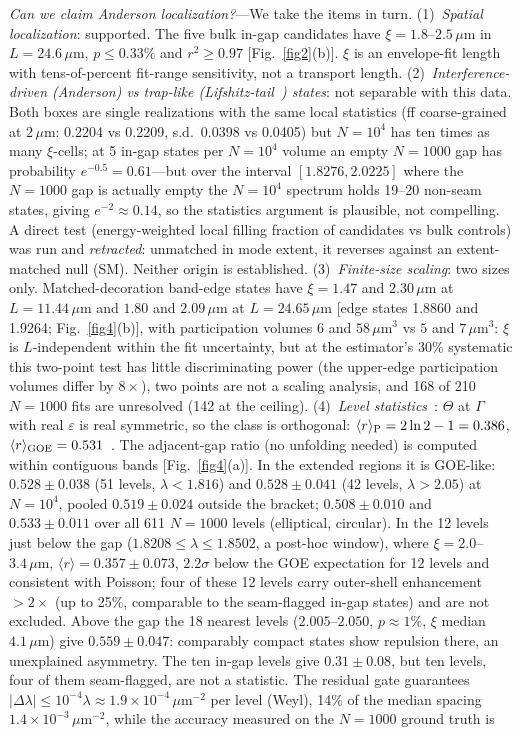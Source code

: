\documentclass[prl,twocolumn,superscriptaddress,showpacs]{revtex4-2}
\newcommand{\um}{\,\mu\mathrm{m}}
\newcommand{\umi}{\,\mu\mathrm{m}^{-2}}
\begin{document}
\emph{Can we claim Anderson localization?}---We take the items in turn. (1)~\emph{Spatial localization}: supported. The five bulk in-gap candidates have $\xi=1.8$--$2.5\um$ in $L=24.6\um$, $p\le0.33\%$ and $r^2\ge0.97$ [Fig.~\ref{fig2}(b)]. $\xi$ is an envelope-fit length with tens-of-percent fit-range sensitivity, not a transport length. (2)~\emph{Interference-driven (Anderson) vs trap-like (Lifshitz-tail~\cite{Lifshitz1964}) states}: not separable with this data. Both boxes are single realizations with the same local statistics (ff coarse-grained at $2\um$: 0.2204 vs 0.2209, s.d.\ 0.0398 vs 0.0405) but $N=10^4$ has ten times as many $\xi$-cells; at 5 in-gap states per $N=10^4$ volume an empty $N=1000$ gap has probability $e^{-0.5}=0.61$---but over the interval $[1.8276,2.0225]$ where the $N=1000$ gap is actually empty the $N=10^4$ spectrum holds 19--20 non-seam states, giving $e^{-2}\approx0.14$, so the statistics argument is plausible, not compelling. A direct test (energy-weighted local filling fraction of candidates vs bulk controls) was run and \emph{retracted}: unmatched in mode extent, it reverses against an extent-matched null (SM). Neither origin is established. (3)~\emph{Finite-size scaling}: two sizes only. Matched-decoration band-edge states have $\xi=1.47$ and $2.30\um$ at $L=11.44\um$ and $1.80$ and $2.09\um$ at $L=24.65\um$ [edge states 1.8860 and 1.9264; Fig.~\ref{fig4}(b)], with participation volumes $6$ and $58\um^3$ vs $5$ and $7\um^3$: $\xi$ is $L$-independent within the fit uncertainty, but at the estimator's 30\% systematic this two-point test has little discriminating power (the upper-edge participation volumes differ by $8\times$), two points are not a scaling analysis, and 168 of 210 $N=1000$ fits are unresolved (142 at the ceiling). (4)~\emph{Level statistics}~\cite{Shklovskii1993,Evers2008}: $\Theta$ at $\Gamma$ with real $\varepsilon$ is real symmetric, so the class is orthogonal: $\langle r\rangle_{\rm P}=2\ln2-1=0.386$, $\langle r\rangle_{\rm GOE}=0.531$~\cite{Oganesyan2007,Atas2013}. The adjacent-gap ratio (no unfolding needed) is computed within contiguous bands [Fig.~\ref{fig4}(a)]. In the extended regions it is GOE-like: $0.528\pm0.038$ (51 levels, $\lambda<1.816$) and $0.528\pm0.041$ (42 levels, $\lambda>2.05$) at $N=10^4$, pooled $0.519\pm0.024$ outside the bracket; $0.508\pm0.010$ and $0.533\pm0.011$ over all 611 $N=1000$ levels (elliptical, circular). In the 12 levels just below the gap ($1.8208\le\lambda\le1.8502$, a post-hoc window), where $\xi=2.0$--$3.4\um$, $\langle r\rangle=0.357\pm0.073$, $2.2\sigma$ below the GOE expectation for 12 levels and consistent with Poisson; four of these 12 levels carry outer-shell enhancement $>2\times$ (up to 25\%, comparable to the seam-flagged in-gap states) and are not excluded. Above the gap the 18 nearest levels ($2.005$--$2.050$, $p\approx1\%$, $\xi$ median $4.1\um$) give $0.559\pm0.047$: comparably compact states show repulsion there, an unexplained asymmetry. The ten in-gap levels give $0.31\pm0.08$, but ten levels, four of them seam-flagged, are not a statistic. The residual gate guarantees $|\Delta\lambda|\le10^{-4}\lambda\approx1.9\times10^{-4}\umi$ per level (Weyl), 14\% of the median spacing $1.4\times10^{-3}\umi$, while the accuracy measured on the $N=1000$ ground truth is 
\end{document}
